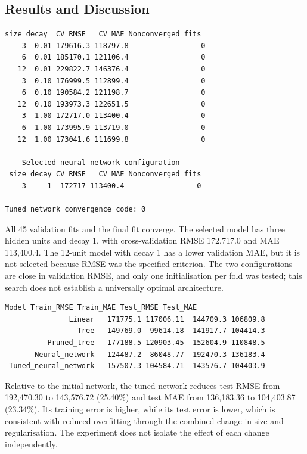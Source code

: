 \documentclass[11pt,a4paper]{article}
\begin{document}
\subsection{Results and Discussion}
\par\noindent\begin{minipage}{\linewidth}
\begin{lstlisting}[style=console]
size decay  CV_RMSE   CV_MAE Nonconverged_fits
    3  0.01 179616.3 118797.8                 0
    6  0.01 185170.1 121106.4                 0
   12  0.01 229822.7 146376.4                 0
    3  0.10 176999.5 112899.4                 0
    6  0.10 190584.2 121198.7                 0
   12  0.10 193973.3 122651.5                 0
    3  1.00 172717.0 113400.4                 0
    6  1.00 173995.9 113719.0                 0
   12  1.00 173041.6 111699.8                 0

--- Selected neural network configuration ---
 size decay CV_RMSE   CV_MAE Nonconverged_fits
    3     1  172717 113400.4                 0

Tuned network convergence code: 0
\end{lstlisting}
\end{minipage}\par
All 45 validation fits and the final fit converge. The selected model has three hidden units and decay 1, with cross-validation RMSE 172,717.0 and MAE 113,400.4. The 12-unit model with decay 1 has a lower validation MAE, but it is not selected because RMSE was the specified criterion. The two configurations are close in validation RMSE, and only one initialisation per fold was tested; this search does not establish a universally optimal architecture.
\par\noindent\begin{minipage}{\linewidth}
\begin{lstlisting}[style=console]
Model Train_RMSE Train_MAE Test_RMSE Test_MAE
               Linear   171775.1 117006.11  144709.3 106809.8
                 Tree   149769.0  99614.18  141917.7 104414.3
          Pruned_tree   177188.5 120903.45  152604.9 110848.5
       Neural_network   124487.2  86048.77  192470.3 136183.4
 Tuned_neural_network   157507.3 104584.71  143576.7 104403.9
\end{lstlisting}
\end{minipage}\par
Relative to the initial network, the tuned network reduces test RMSE from 192,470.30 to 143,576.72 (25.40\%) and test MAE from 136,183.36 to 104,403.87 (23.34\%). Its training error is higher, while its test error is lower, which is consistent with reduced overfitting through the combined change in size and regularisation. The experiment does not isolate the effect of each change independently.
\end{document}
